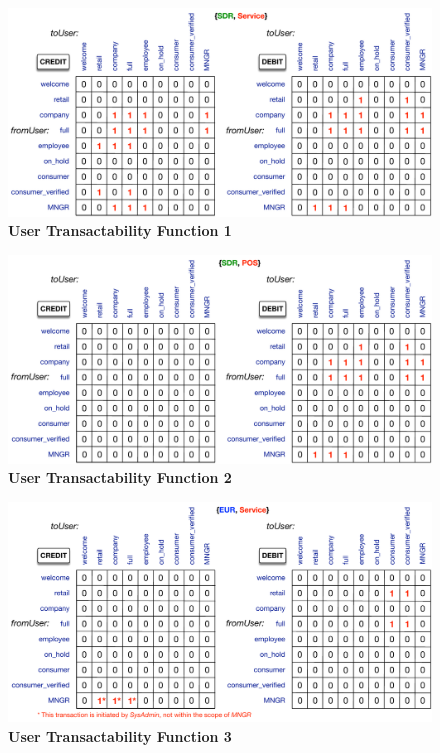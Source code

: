 \begin{figure}[h]
\vspace{-0.5cm}
\centering
\includegraphics[width=17.5cm]{Figures/UTF1}
\caption{\small\textbf{User Transactability Function 1}}
\label{fig:UTF1}
\end{figure}

\begin{figure}[h]
\centering
\includegraphics[width=17.5cm]{Figures/UTF2}
\caption{\small\textbf{User Transactability Function 2}}
\label{fig:UTF2}
\end{figure}

\begin{figure}[H]
\vspace{-0.5cm}
\centering
\includegraphics[width=17.5cm]{Figures/UTF3}
\caption{\small\textbf{User Transactability Function 3}}
\label{fig:UTF3}
\end{figure}

